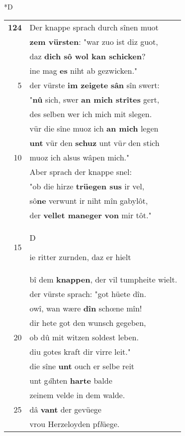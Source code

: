\documentclass[8pt,a4paper,notitlepage]{article}
\begin{document}
\begin{table}[ht]
\begin{minipage}[t]{0.5\linewidth}
\small
\begin{center}*D
\end{center}
\begin{tabular}{rl}
\textbf{124} & Der knappe sprach durch sînen muot\\ 
 & \textbf{zem vürsten}: "war zuo ist diz guot,\\ 
 & daz \textbf{dich sô wol kan schicken}?\\ 
 & ine mag \textbf{es} niht ab gezwicken."\\ 
5 & der vürste \textbf{im zeigete} \textbf{sân} sîn swert:\\ 
 & "\textbf{nû} sich, swer \textbf{an mich strîtes} gert,\\ 
 & des selben wer ich mich mit slegen.\\ 
 & vür die sîne muoz ich \textbf{an mich} legen\\ 
 & \textbf{unt} vür den \textbf{schuz} unt vü\textit{r} den stich\\ 
10 & muoz ich alsus wâpen mich."\\ 
 & Aber sprach der knappe snel:\\ 
 & "ob die hirze \textbf{trüegen sus} ir vel,\\ 
 & sô\textbf{ne} verwunt ir niht mîn gabylôt,\\ 
 & der \textbf{vellet maneger} \textbf{von} mir tôt."\\ 
15 & \begin{large}D\end{large}ie ritter zurnden, daz er hielt\\ 
 & bî dem \textbf{knappen}, der vil tumpheite wielt.\\ 
 & der vürste sprach: "got hüete dîn.\\ 
 & owî, wan wære \textbf{dîn} schœne mîn!\\ 
 & dir hete got den wunsch gegeben,\\ 
20 & ob dû mit witzen soldest leben.\\ 
 & diu gotes kraft dir virre leit."\\ 
 & die sîne \textbf{unt} ouch er selbe reit\\ 
 & unt g\textit{â}hten \textbf{harte} balde\\ 
 & zeinem velde in dem walde.\\ 
25 & dâ \textbf{vant} der gevüege\\ 
 & vrou Herzeloyden pf\textit{l}üege.\\ 

\end{tabular}
\end{minipage}
\end{table}
\end{document}
